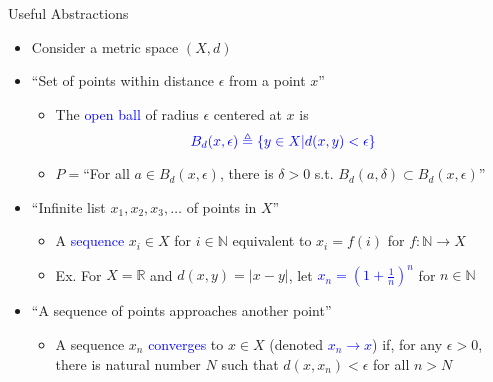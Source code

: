 \documentclass[10pt,english]{beamer}
\begin{document}
\begin{frame}{Useful Abstractions}

\hfill
\scalebox{0.9}{%
\begin{tikzpicture}
\draw[very thick] (0,0) rectangle (3,2.75) node[below left=0.2cm and 0.2cm] {$X$};
\draw[thick,dashed,blue,fill=blue!10] (1.25,1.25) circle (1) node[above=0.3cm] {$B(x,\epsilon)$};
\node [label=right:{$x$},draw,fill=black,circle,inner sep=0pt,minimum size=2pt] at (1.25,1.25) {};
\draw[-latex] (1.25,1.25) -- node[below] {$\epsilon$} (0.25,1.25);
\end{tikzpicture}}
\vspace{-18mm}

\begin{itemize}
\setlength\itemsep{4mm}
\item<1-> Consider a metric space $(X,d)$

\item<1-> ``Set of points within distance $\epsilon$ from a point $x$'' \vspace{1mm}
\begin{itemize} 
  \setlength\itemsep{1.5mm}
  \item The \textcolor{blue}{open ball} of radius $\epsilon$ centered at $x$ is \vspace{-1mm} \[\color{blue} B_d(x,\epsilon) \triangleq \left\{ y \in X | d(x,y) < \epsilon \right\} \vspace{-5mm} \]
  \item $P=$``For all $a\!\in\! B_d (x,\epsilon)$, there is $\delta\!>\!0$ s.t. $B_d (a,\delta) \subset B_d (x,\epsilon)$''
\end{itemize}

\item<2-> ``Infinite list $x_1,x_2,x_3,\ldots$ of points in $X$'' \vspace{1mm}
\begin{itemize} 
  \setlength\itemsep{1.5mm}
  \item A \textcolor{blue}{sequence} $x_i \in X$ for $i\in \mathbb{N}$ equivalent to $x_i = f(i)$ for $f:\mathbb{N}\to X$
  \item Ex. For $X=\mathbb{R}$ and $d(x,y)=|x-y|$, let \textcolor{blue}{$x_n = \left(1+\frac{1}{n}\right)^n$} for $n\in \mathbb{N}$
\end{itemize}

\item<3-> ``A sequence of points approaches another point'' \vspace{1mm}
\begin{itemize} 
  \setlength\itemsep{1.5mm}
  \item A sequence $x_n$ \textcolor{blue}{converges} to $x\in X$ (denoted \textcolor{blue}{$x_n \to x$})  if, for any $\epsilon >0$, there is natural number $N$ such that $d(x,x_n) < \epsilon$ for all $n>N$
\end{itemize}
  
\end{itemize}
\end{frame}
\end{document}
